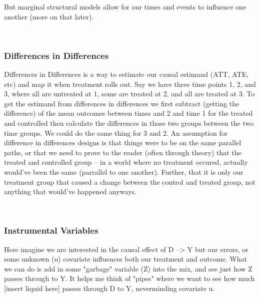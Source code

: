 \documentclass[12pt]{article}\usepackage[]{graphicx}\usepackage[]{color}
\begin{document}
\begin{flushleft}
\noindent But marginal structural models allow for our times and events to influence one another (more on that later).


\hfill \\

\subsubsection{Differences in Differences}
Differences in Differences is a way to estimate our causal estimand (ATT, ATE, etc) and map it when treatment rolls out. Say we have three time points 1, 2, and 3, where all are untreated at 1, some are treated at 2, and all are treated at 3. To get the estimand from differences in differences we first subtract (getting the difference) of the mean outcomes between times and 2 and time 1 for the treated and controlled then calculate the differences in those two groups between the two time groups. We could do the same thing for 3 and 2. An assumption for difference in differences designs is that things were to be on the same parallel paths, or that we need to prove to the reader (often through theory) that the treated and controlled group -- in a world where no treatment occured, actually would've been the same (parrallel to one another). Further, that it is only our treatment group that caused a change between the control and treated group, not anything that would've happened anyways.

\hfill \\

\subsubsection{Instrumental Variables}

Here imagine we are interested in the causal effect of D --> Y but our errors, or some unknown (u) covariate influences both our treatment and outcome. What we can do is add in some "garbage" variable (Z) into the mix, and see just how Z passes through to Y. It helps me think of "pipes" where we want to see how much [insert liquid here] passes through D to Y, neverminding covariate u.


\end{flushleft}
\end{document}
